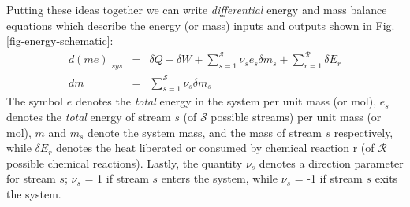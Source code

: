 \documentclass[11pt]{article}
\theoremstyle{definition}
\begin{document}
Putting these ideas together we can write \textit{differential} energy and mass balance equations which describe the energy (or mass) inputs and outputs shown in Fig. \ref{fig-energy-schematic}:
\begin{eqnarray}\label{eqn:energy-balance-precursor}
d\left(me\right)\Bigr|_{sys} &=& \delta{Q}+\delta{W}+\sum_{s=1}^{\mathcal{S}}\nu_{s}e_{s}\delta{m}_{s} + \sum_{r=1}^{\mathcal{R}}\delta E_{r}\\\label{eqn:material-balance-precursor}
dm &=& \sum_{s=1}^{\mathcal{S}}\nu_{s}\delta{m}_{s}
\end{eqnarray}The symbol $e$ denotes the \textit{total} energy in the system per unit mass (or mol), $e_{s}$ denotes the \textit{total} energy of stream $s$ (of $\mathcal{S}$ possible streams) per unit mass (or mol),
$m$ and $m_{s}$ denote the system mass, and the mass of stream $s$ respectively, while $\delta E_{r}$ denotes the heat liberated or consumed by chemical reaction r (of $\mathcal{R}$ possible chemical reactions).
Lastly, the quantity $\nu_{s}$ denotes a direction parameter for stream $s$; $\nu_{s}$ = 1 if stream $s$ enters the system, while $\nu_{s}$ = -1 if stream $s$ exits the system.
\end{document}
